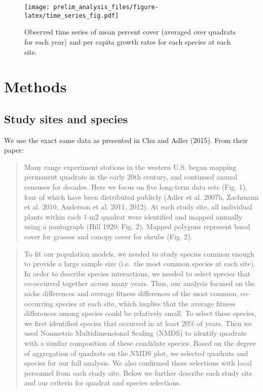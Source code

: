 \documentclass[12pt,]{article}
\begin{document}
\begin{figure}[htbp]
\centering
\texttt{[image: prelim\_analysis\_files/figure-latex/time\_series\_fig.pdf]}
\caption{Observed time series of mean percent cover (averaged over
quadrats for each year) and per capita growth rates for each species at
each site.}
\end{figure}

\section{Methods}\label{methods}

\subsection{Study sites and species}\label{study-sites-and-species}

We use the exact same data as presented in Chu and Adler (2015). From
their paper:

\begin{quote}
Many range experiment stations in the western U.S. began mapping
permanent quadrats in the early 20th century, and continued annual
censuses for decades. Here we focus on five long-term data sets (Fig.
1), four of which have been distributed publicly (Adler et al. 2007b,
Zachmann et al. 2010, Anderson et al. 2011, 2012). At each study site,
all individual plants within each 1-m2 quadrat were identified and
mapped annually using a pantograph (Hill 1920; Fig. 2). Mapped polygons
represent basal cover for grasses and canopy cover for shrubs (Fig. 2).
\end{quote}

\begin{quote}
To fit our population models, we needed to study species common enough
to provide a large sample size (i.e.~the most common species at each
site). In order to describe species interactions, we needed to select
species that co-occurred together across many years. Thus, our analysis
focused on the niche differences and average fitness differences of the
most common, co-occurring species at each site, which implies that the
average fitness differences among species could be relatively small. To
select these species, we first identified species that occurred in at
least 20\% of years. Then we used Nonmetric Multidimensional Scaling
(NMDS) to identify quadrats with a similar composition of these
candidate species. Based on the degree of aggregation of quadrats on the
NMDS plot, we selected quadrats and species for our full analysis. We
also confirmed these selections with local personnel from each study
site. Below we further describe each study site and our criteria for
quadrat and species selections.
\end{quote}
\end{document}
